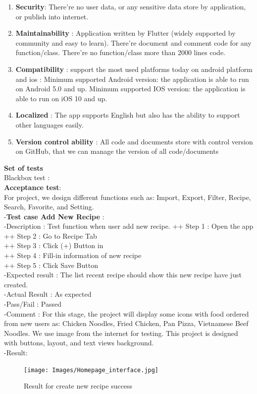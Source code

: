 \documentclass{article}
\begin{document}
\begin{enumerate}
        \item \textbf{Security}: There’re no user data, or any sensitive data store by application, or publish into internet. 
        \item \textbf{Maintainability} : Application written by Flutter (widely supported by community and easy to learn). There’re document and comment code for any function/class. There’re no function/class more than 2000 lines code. 
        \item \textbf{Compatibility} : support the most used platforms today on android platform and ios :  Minimum supported Android version: the application is able to run on Android 5.0 and up.  Minimum supported IOS version: the application is able to run on iOS 10 and up. 
        \item \textbf{Localized} : The app supports English but also has the ability to support other languages easily. 
        \item \textbf{Version control ability} : All code and documents store with control version on GitHub, that we can manage the version of all code/documents 
    \end{enumerate}

\textbf{Set of tests} \\

    Blackbox test :   \\
    \textbf{Acceptance test}: \\
        For project, we design different functions such as: Import, Export, Filter, Recipe, Search, Favorite, and Setting. \\

    -\textbf{Test case Add New Recipe }: \\
        -Description : Test function when user add new recipe.
        ++ Step 1 : Open the app  \\
        ++ Step 2 : Go to Recipe Tab \\
        ++ Step 3 : Click (+) Button in  \\
        ++ Step 4 : Fill-in information of new recipe \\
        ++ Step 5 : Click Save Button \\
        -Expected result : The list recent recipe should show this new recipe have just created. \\
        -Actual Result : As expected \\
        -Pass/Fail : Passed \\
        -Comment : For this stage, the project will display some icons with food ordered from new users as: Chicken Noodles, Fried Chicken, Pan Pizza, Vietnamese Beef Noodles. We use image from the internet for testing. This project is designed with buttons, layout, and text views background. \\
        -Result:
        \begin{figure}[h!]
        \centering
        \texttt{[image: Images/Homepage\_interface.jpg]}
        \caption{Result for create new recipe success}
        \label{fig:cookingbook}
        \end{figure}
\end{document}
